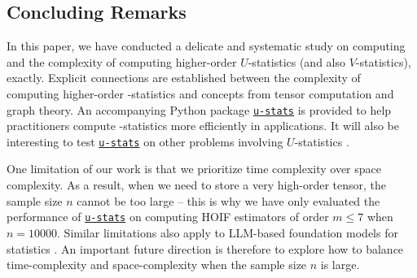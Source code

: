 \documentclass[letterpaper,11pt]{article}
\newcommand{\Lin}[1]{{\color{purple}{Lin: #1}}}
\def\Einsum{\textsc{Einsum}}
\newcommand{\libref}[2]{\href{#2}{\texttt{#1}}}
\def\package{\libref{u-stats}{https://github.com/zrq1706/U-Statistics-Python}}
\newcommand{\opteinsum}{\libref{opt-einsum}{https://dgasmith.github.io/opt_einsum/}}
\begin{document}
\begin{bibunit}[plainnat]
\fi

\section{Concluding Remarks}
\label{sec:conclusions}

In this paper, we have conducted a delicate and systematic study on computing and the complexity of computing higher-order $U$-statistics (and also $V$-statistics), exactly. Explicit connections are established between the complexity of computing higher-order -statistics and concepts from tensor computation and graph theory. An accompanying Python package \package{} is provided to help practitioners compute -statistics more efficiently in applications. %
It will also be interesting to test \package{} on other problems involving $U$-statistics \citep{qiu2024neural, shen2025engression}. 

One limitation of our work is that we prioritize time complexity over space complexity. As a result, when we need to store a very high-order tensor, the sample size $n$ cannot be too large -- this is why we have only evaluated the performance of \package{} on computing HOIF estimators of order $m \leq 7$ when $n = 10000$. Similar limitations also apply to LLM-based foundation models for statistics \citep{hollmann2025accurate}. An important future direction is therefore to explore how to balance time-complexity and space-complexity when the sample size $n$ is large.


\end{bibunit}
\end{document}
